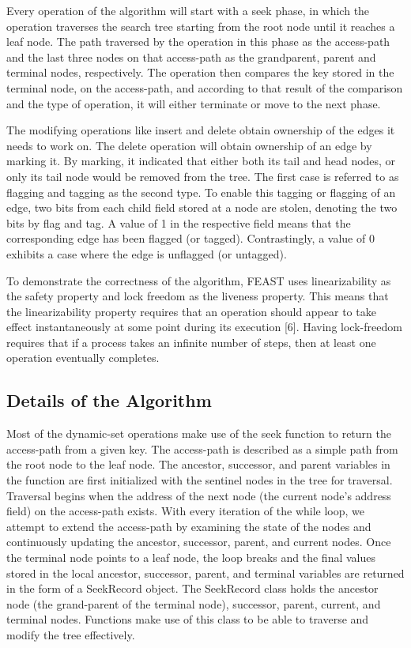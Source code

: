 \documentclass[conference]{IEEEtran}
\begin{document}
Every operation of the algorithm will start with a seek phase, in which the operation traverses the search tree starting from the root node until it reaches a leaf node. The path traversed by the operation in this phase as the access-path and the last three nodes on that access-path as the grandparent, parent and terminal nodes, respectively. The operation then compares the key stored in the terminal node, on the access-path, and according to that result of the comparison and the type of operation, it will either terminate or move to the next phase.

The modifying operations like insert and delete obtain ownership of the edges it needs to work on. The delete operation will obtain ownership of an edge by marking it. By marking, it indicated that either both its tail and head nodes, or only its tail node would be removed from the tree. The first case is referred to as flagging and tagging as the second type. To enable this tagging or flagging of an edge, two bits from each child field stored at a node are stolen, denoting the two bits by flag and tag. A value of 1 in the respective field means that the corresponding edge has been flagged (or tagged). Contrastingly, a value of 0 exhibits a case where the edge is unflagged (or untagged).

To demonstrate the correctness of the algorithm, FEAST uses linearizability as the safety property and lock freedom as the liveness property. This means that the linearizability property requires that an operation should appear to take effect instantaneously at some point during its execution [6]. Having lock-freedom requires that if a process takes an infinite number of steps, then at least one operation eventually completes.

\subsection{Details of the Algorithm}
 Most of the dynamic-set operations make use of the seek function to return the access-path from a given key. The access-path is described as a simple path from the root node to the leaf node. The ancestor, successor, and parent variables in the function are first initialized with the sentinel nodes in the tree for traversal. Traversal begins when the address of the next node (the current node’s address field) on the access-path exists. With every iteration of the while loop, we attempt to extend the access-path by examining the state of the nodes and continuously updating the ancestor, successor, parent, and current nodes. Once the terminal node points to a leaf node, the loop breaks and the final values stored in the local ancestor, successor, parent, and terminal variables are returned in the form of a SeekRecord object. The SeekRecord class holds the ancestor node (the grand-parent of the terminal node), successor, parent, current, and terminal nodes. Functions make use of this class to be able to traverse and modify the tree effectively.
\end{document}
